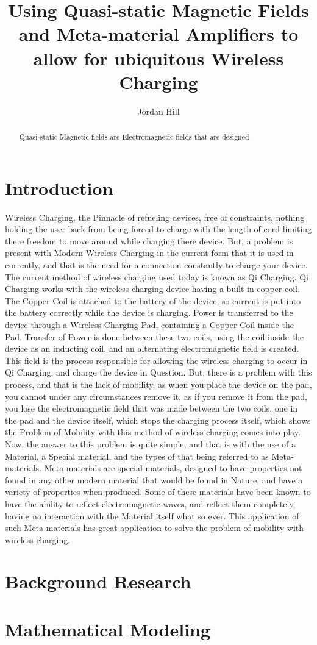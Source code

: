 \documentclass[]{article}
\title{Using Quasi-static Magnetic Fields and Meta-material Amplifiers to allow for ubiquitous Wireless Charging}
\author{Jordan Hill}
\begin{document}
\maketitle

\begin{abstract}
Quasi-static Magnetic fields are Electromagnetic fields that are designed
\end{abstract}

\section{Introduction}
Wireless Charging, the Pinnacle of refueling devices, free of constraints, nothing holding the user back from being forced to charge with the length of cord limiting there freedom to move around while charging there device. But, a problem is present with Modern Wireless Charging in the current form that it is used in currently, and that is the need for a connection constantly to charge your device. The current method of wireless charging used today is known as Qi Charging. Qi Charging works with the wireless charging device having a built in copper coil. The Copper Coil is attached to the battery of the device, so current is put into the battery correctly while the device is charging. Power is transferred to the device through a Wireless Charging Pad, containing a Copper Coil inside the Pad. Transfer of Power is done between these two coils, using the coil inside the device as an inducting coil, and an alternating electromagnetic field is created. This field is the process responsible for allowing the wireless charging to occur in Qi Charging, and charge the device in Question. But, there is a problem with this process, and that is the lack of mobility, as when you place the device on the pad, you cannot under any circumstances remove it, as if you remove it from the pad, you lose the electromagnetic field that was made between the two coils, one in the pad and the device itself, which stops the charging process itself, which shows the Problem of Mobility with this method of wireless charging comes into play. Now, the answer to this problem is quite simple, and that is with the use of a Material, a Special material, and the types of that being referred to as Meta-materials. Meta-materials are special materials, designed to have properties not found in any other modern material that would be found in Nature, and have a variety of properties when produced. Some of these materials have been known to have the ability to reflect electromagnetic waves, and reflect them completely, having no interaction with the Material itself what so ever. This application of such Meta-materials has great application to solve the problem of mobility with wireless charging. 
\section{Background Research}

\section{Mathematical Modeling}
\end{document}
